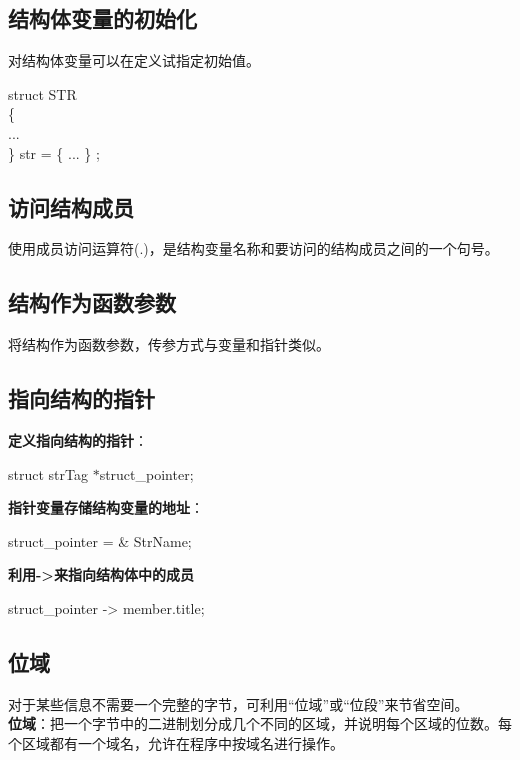 \documentclass[UTF8]{ctexart}
\begin{document}
			\subsection{结构体变量的初始化}
			对结构体变量可以在定义试指定初始值。
			\begin{framed}
				struct STR\\
				\{\\
					...\\
				\} str = \{ ... \} ;\\

			\end{framed}

			\subsection{访问结构成员}
			使用成员访问运算符(.)，是结构变量名称和要访问的结构成员之间的一个句号。

			\subsection{结构作为函数参数}
			将结构作为函数参数，传参方式与变量和指针类似。

			\subsection{指向结构的指针}
			\textbf{定义指向结构的指针}：\begin{framed}
				struct strTag $*$struct\_pointer;
			\end{framed}
			\textbf{指针变量存储结构变量的地址}：
			\begin{framed}
				struct\_pointer = \& StrName;
			\end{framed}
			\textbf{利用->来指向结构体中的成员}
			\begin{framed}
				struct\_pointer -> member.title;
			\end{framed}

			\subsection{位域}
			对于某些信息不需要一个完整的字节，可利用“位域”或“位段”来节省空间。\\
			\textbf{位域}：把一个字节中的二进制划分成几个不同的区域，并说明每个区域的位数。每个区域都有一个域名，允许在程序中按域名进行操作。
\end{document}
